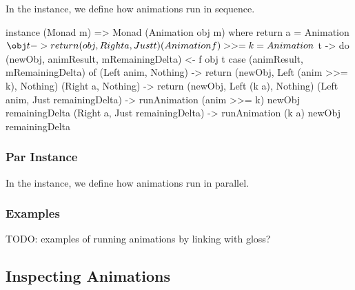 In the  instance, we define how animations run in sequence.

\begin{code}
instance (Monad m) => Monad (Animation obj m) where
  return a = Animation $ \obj t -> return (obj, Right a, Just t)
  (Animation f) >>= k = Animation $ \obj t -> do
    (newObj, animResult, mRemainingDelta) <- f obj t
    case (animResult, mRemainingDelta) of
      (Left anim, Nothing) ->
        return (newObj, Left (anim >>= k), Nothing)
      (Right a, Nothing) ->
        return (newObj, Left (k a), Nothing)
      (Left anim, Just remainingDelta) ->
        runAnimation (anim >>= k) newObj remainingDelta
      (Right a, Just remainingDelta) ->
        runAnimation (k a) newObj remainingDelta
\end{code}

\subsubsection{Par Instance}

In the  instance, we define how animations run in parallel.


\subsubsection{Examples}

TODO: examples of running animations by linking with gloss?

\subsection{Inspecting Animations}


